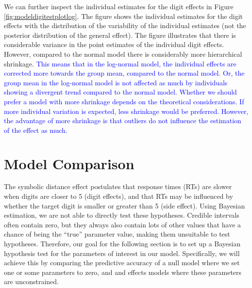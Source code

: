 \documentclass[
  english,
  doc,floatsintext]{apa6}
\begin{document}
We can further inspect the individual estimates for the digit effects in Figure \ref{fig:modeldigitestplotlog}. The figure shows the individual estimates for the digit effects with the distribution of the variability of the individual estimates (not the posterior distribution of the general effect). The figure illustrates that there is considerable variance in the point estimates of the individual digit effects. However, compared to the normal model there is considerably more hierarchical shrinkage. \textcolor{blue}{This means that in the log-normal model, the individual effects are corrected more towards the group mean, compared to the normal model. Or, the group mean in the log-normal model is not affected as much by individuals showing a divergent trend compared to the normal model. Whether we should prefer a model with more shrinkage depends on the theoretical considerations. If more individual variation is expected, less shrinkage would be preferred. However, the advantage of more shrinkage is that outliers do not influence the estimation of the effect as much. }

\hypertarget{model-comparison}{%
\section{Model Comparison}\label{model-comparison}}

The symbolic distance effect postulates that response times (RTs) are slower when digits are closer to 5 (digit effects), and that RTs may be influenced by whether the target digit is smaller or greater than 5 (side effect). Using Bayesian estimation, we are not able to directly test these hypotheses. Credible intervals often contain zero, but they always also contain lots of other values that have a chance of being the ``true'' parameter value, making them unsuitable to test hypotheses. Therefore, our goal for the following section is to set up a Bayesian hypothesis test for the parameters of interest in our model. Specifically, we will achieve this by comparing the predictive accuracy of a null model where we set one or some parameters to zero, and and effects models where these parameters are unconstrained.
\end{document}
